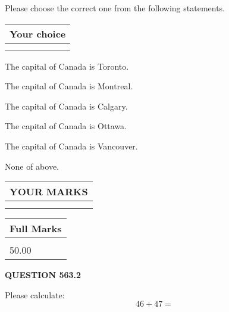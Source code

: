 \documentclass[12pt]{article}
\begin{document}
  
Please choose the correct one from the following statements.
  
  
\noindent\hspace{3.0in} \begin{tabular}{|l|}
\hline
Your choice \\
\hline
 \\ 
 \\ 
\hline
\end{tabular}
  
  
 
 
The capital of Canada is Toronto.
 
 
The capital of Canada is Montreal.
 
 
The capital of Canada is Calgary.
 
 
The capital of Canada is Ottawa.
 
 
The capital of Canada is Vancouver.
 
 
 None of above.
 
 
  
\vspace{0.2in}
  
\noindent\begin{tabular}{|l|}
\hline
 YOUR MARKS  \\
\hline
 \\ 
 \\ 
\hline
\end{tabular}
\hspace{0.05in} \begin{tabular}{|l|}
\hline
 Full Marks  \\
\hline
 \\ 
50.00 \\
\hline
\end{tabular}
{\textbf{\Large{QUESTION
563.2 
}}}
  
  
 
Please calculate:
\begin{equation}
46 +  %
47 = \nonumber
\end{equation}
 

 

 
   
   
 \vspace{0.2in}
 
   
   
   
   
\end{document}
